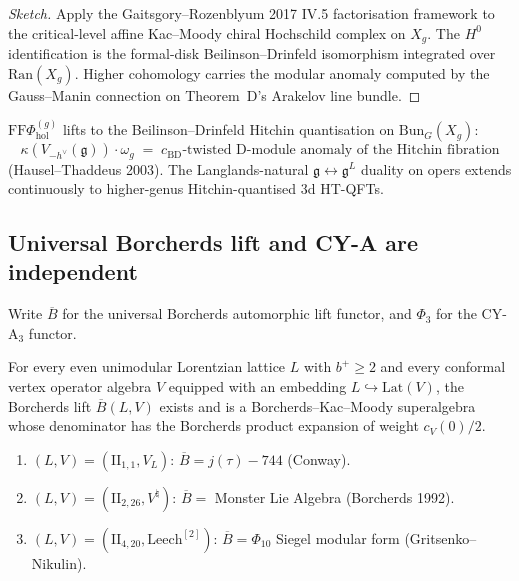 \documentclass[11pt]{article}
\begin{document}
\begin{remark}
\begin{proof}[Sketch]
Apply the Gaitsgory--Rozenblyum 2017 IV.5 factorisation framework
to the critical-level affine Kac--Moody chiral Hochschild complex
on $X_g$. The $H^0$ identification is the formal-disk
Beilinson--Drinfeld isomorphism integrated over $\mathrm{Ran}(X_g)$.
Higher cohomology carries the modular anomaly computed by the
Gauss--Manin connection on Theorem~D's Arakelov line bundle.
\end{proof}

\begin{corollary}
$\mathrm{FF}\Phi_{\mathrm{hol}}^{(g)}$ lifts to the
Beilinson--Drinfeld Hitchin quantisation on $\mathrm{Bun}_G(X_g)$:
\[
  \kappa(V_{-h^{\vee}}(\mathfrak{g})) \cdot \omega_g
  \;=\;
  c_{\mathrm{BD}}\text{-twisted D-module anomaly of the Hitchin fibration}
\]
(Hausel--Thaddeus 2003). The
Langlands-natural $\mathfrak{g} \leftrightarrow \mathfrak{g}^L$
duality on opers extends continuously to higher-genus
Hitchin-quantised 3d HT-QFTs.
\end{corollary}

\subsection{Universal Borcherds lift and CY-A are independent}
\label{subsec:borcherds-cya-independence}

Write $\overline{B}$ for the universal Borcherds automorphic lift
functor, and $\Phi_3$ for the CY-A$_3$ functor.

\begin{theorem}
\label{thm:universal-borcherds}
For every even unimodular Lorentzian lattice $L$ with $b^+ \ge 2$
and every conformal vertex operator algebra $V$ equipped with an
embedding $L \hookrightarrow \mathrm{Lat}(V)$, the Borcherds lift
$\overline{B}(L, V)$ exists and is a Borcherds--Kac--Moody
superalgebra whose denominator has the Borcherds product expansion
of weight $c_V(0)/2$.
\end{theorem}

\begin{example}
\label{ex:borcherds-three}
\begin{enumerate}
\item $(L, V) = (\mathrm{II}_{1,1}, V_L)$: $\overline{B} = j(\tau) - 744$
(Conway).
\item $(L, V) = (\mathrm{II}_{2,26}, V^{\natural})$: $\overline{B} =$
Monster Lie Algebra (Borcherds 1992).
\item $(L, V) = (\mathrm{II}_{4,20}, \mathrm{Leech}^{[2]})$:
$\overline{B} = \Phi_{10}$ Siegel modular form
(Gritsenko--Nikulin).
\end{enumerate}
\end{example}


\end{remark}
\end{document}
